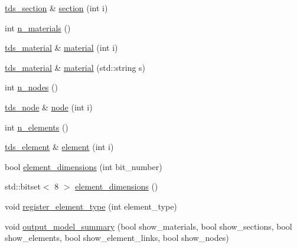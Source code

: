 \begin{DoxyCompactItemize}
\item 
\hyperlink{classtds__section}{tds\+\_\+section} \& \hyperlink{classtds_a09ac79f6931aaf6af64feaca4f167409}{section} (int i)
\item 
int \hyperlink{classtds_a3d95be9cb7cd20cd89144033f6f808b8}{n\+\_\+materials} ()
\item 
\hyperlink{classtds__material}{tds\+\_\+material} \& \hyperlink{classtds_ac62efbdbea35b9f2af42a7b184eba992}{material} (int i)
\item 
\hyperlink{classtds__material}{tds\+\_\+material} \& \hyperlink{classtds_af680ffcaf2c50cd226f551f33cc351de}{material} (std\+::string s)
\item 
int \hyperlink{classtds_a59b1fe5843f09e2fe2316d3ba340bac2}{n\+\_\+nodes} ()
\item 
\hyperlink{classtds__node}{tds\+\_\+node} \& \hyperlink{classtds_acfd60141492b80d9c0e2edb1542af11e}{node} (int i)
\item 
int \hyperlink{classtds_aa345b4a615773c12b30a9f7880775d03}{n\+\_\+elements} ()
\item 
\hyperlink{classtds__element}{tds\+\_\+element} \& \hyperlink{classtds_aec8ca7ac2f04016feeac7bb3f06da314}{element} (int i)
\item 
bool \hyperlink{classtds_a011b6ab393bba61616bca5039ad1f69d}{element\+\_\+dimensions} (int bit\+\_\+number)
\item 
std\+::bitset$<$ 8 $>$ \hyperlink{classtds_a3d31ef1f680a71a98545174b4a52d55d}{element\+\_\+dimensions} ()
\item 
void \hyperlink{classtds_ac3ecc9ac7957074b65f4db63f5e6ad3e}{register\+\_\+element\+\_\+type} (int element\+\_\+type)
\item 
void \hyperlink{classtds_a7071fbcd6cb5fcd12f4a91d4d47627c3}{output\+\_\+model\+\_\+summary} (bool show\+\_\+materials, bool show\+\_\+sections, bool show\+\_\+elements, bool show\+\_\+element\+\_\+links, bool show\+\_\+nodes)
\end{DoxyCompactItemize}
